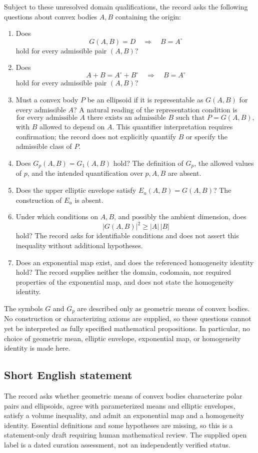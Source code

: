 \documentclass[11pt]{article}
\begin{document}
Subject to these unresolved domain qualifications, the record asks the following questions about convex bodies \(A,B\) containing the origin:
\begin{enumerate}
\item Does
\[
G(A,B)=D\quad\Longrightarrow\quad B=A^\circ
\]
hold for every admissible pair \((A,B)\)?
\item Does
\[
A+B=A^\circ+B^\circ\quad\Longrightarrow\quad B=A^\circ
\]
hold for every admissible pair \((A,B)\)?
\item Must a convex body \(P\) be an ellipsoid if it is representable as \(G(A,B)\) for every admissible \(A\)? A natural reading of the representation condition is
\[
\text{for every admissible }A\text{ there exists an admissible }B
\text{ such that }P=G(A,B),
\]
with \(B\) allowed to depend on \(A\). This quantifier interpretation requires confirmation; the record does not explicitly quantify \(B\) or specify the admissible class of \(P\).
\item Does \(G_p(A,B)=G_1(A,B)\) hold? The definition of \(G_p\), the allowed values of \(p\), and the intended quantification over \(p,A,B\) are absent.
\item Does the upper elliptic envelope satisfy \(E_u(A,B)=G(A,B)\)? The construction of \(E_u\) is absent.
\item Under which conditions on \(A,B\), and possibly the ambient dimension, does
\[
|G(A,B)|^2\geq |A|\,|B|
\]
hold? The record asks for identifiable conditions and does not assert this inequality without additional hypotheses.
\item Does an exponential map exist, and does the referenced homogeneity identity hold? The record supplies neither the domain, codomain, nor required properties of the exponential map, and does not state the homogeneity identity.
\end{enumerate}
The symbols \(G\) and \(G_p\) are described only as geometric means of convex bodies. No construction or characterizing axioms are supplied, so these questions cannot yet be interpreted as fully specified mathematical propositions. In particular, no choice of geometric mean, elliptic envelope, exponential map, or homogeneity identity is made here.
\subsection{Short English statement}
The record asks whether geometric means of convex bodies characterize polar pairs and ellipsoids, agree with parameterized means and elliptic envelopes, satisfy a volume inequality, and admit an exponential map and a homogeneity identity. Essential definitions and some hypotheses are missing, so this is a statement-only draft requiring human mathematical review. The supplied open label is a dated curation assessment, not an independently verified status.
\end{document}
